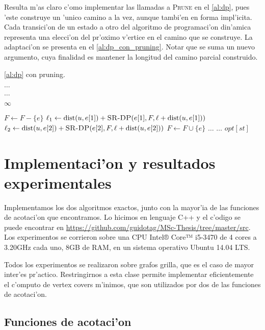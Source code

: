 Resulta m'as claro c'omo implementar las llamadas a \textsc{Prune} en el  \autoref{al:dp}, pues 'este construye un 'unico camino a la vez, aunque tambi'en en forma impl'icita. Cada transici'on de un estado a otro del algoritmo de programaci'on din'amica representa una elecci'on del pr'oximo v'ertice en el camino que se construye. La adaptaci'on se presenta en el \autoref{al:dp_con_pruning}. Notar que se suma un nuevo argumento, cuya finalidad es mantener la longitud del camino parcial construido.

\begin{algorithm}
  \caption{\autoref{al:dp} con pruning.}
  \label{al:dp_con_pruning}
  \begin{algorithmic}[1]
	\State $\dots$
	
		\State $\dots$
	\EndIf
	
		\Return $\infty$
	\EndIf
	
		\State $F \gets F - \{e\}$
		\State $\ell_1 \gets \textnormal{dist}(u, e[1]) + \textsc{SR-DP}(e[1], F, \ell + \textnormal{dist}(u, e[1]))$
		\State $\ell_2 \gets \textnormal{dist}(u, e[2]) + \textsc{SR-DP}(e[2], F, \ell + \textnormal{dist}(u, e[2]))$
		\State $F \gets F \cup \{e\}$
		\State $\dots$	
	\EndFor
	\State $\dots$
	\Return $opt[st]$
	\EndFunction
  \end{algorithmic}
\end{algorithm}

\section{Implementaci'on y resultados experimentales}

Implementamos los dos algoritmos exactos, junto con la mayor'ia de las funciones de acotaci'on que encontramos. Lo hicimos en lenguaje C++ y el c'odigo se puede encontrar en \url{https://github.com/guidotag/MSc-Thesis/tree/master/src}. Los experimentos se corrieron sobre una CPU Intel® Core™ i5-3470 de 4 cores a 3.20GHz cada uno, 8GB de RAM, en un sistema operativo Ubuntu 14.04 LTS.

Todos los experimentos se realizaron sobre grafos grilla, que es el caso de mayor inter'es pr'actico. Restringirnos a esta clase permite implementar eficientemente el c'omputo de vertex covers m'inimos, que son utilizados por dos de las funciones de acotaci'on.

\subsection{Funciones de acotaci'on}

